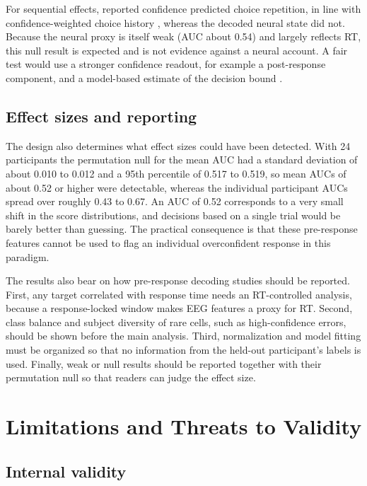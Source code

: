 \documentclass[11pt,a4paper]{article}
\begin{document}
For sequential effects, reported confidence predicted choice repetition, in line with confidence-weighted choice history \cite{r20}, whereas the decoded neural state did not. Because the neural proxy is itself weak (AUC about 0.54) and largely reflects RT, this null result is expected and is not evidence against a neural account. A fair test would use a stronger confidence readout, for example a post-response component, and a model-based estimate of the decision bound \cite{r22}.

\subsection{Effect sizes and reporting}

The design also determines what effect sizes could have been detected. With 24 participants the permutation null for the mean AUC had a standard deviation of about 0.010 to 0.012 and a 95th percentile of 0.517 to 0.519, so mean AUCs of about 0.52 or higher were detectable, whereas the individual participant AUCs spread over roughly 0.43 to 0.67. An AUC of 0.52 corresponds to a very small shift in the score distributions, and decisions based on a single trial would be barely better than guessing. The practical consequence is that these pre-response features cannot be used to flag an individual overconfident response in this paradigm.

The results also bear on how pre-response decoding studies should be reported. First, any target correlated with response time needs an RT-controlled analysis, because a response-locked window makes EEG features a proxy for RT. Second, class balance and subject diversity of rare cells, such as high-confidence errors, should be shown before the main analysis. Third, normalization and model fitting must be organized so that no information from the held-out participant's labels is used. Finally, weak or null results should be reported together with their permutation null so that readers can judge the effect size.

\section{Limitations and Threats to Validity}

\subsection{Internal validity}
\end{document}
